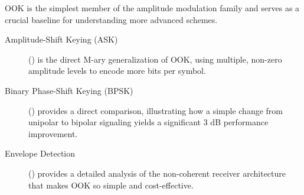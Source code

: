 \begin{importantbox}[title={Further Reading}]
    OOK is the simplest member of the amplitude modulation family and serves as a crucial baseline for understanding more advanced schemes.
    \begin{description}
        \item[Amplitude-Shift Keying (ASK)] () is the direct M-ary generalization of OOK, using multiple, non-zero amplitude levels to encode more bits per symbol.
        \item[Binary Phase-Shift Keying (BPSK)] () provides a direct comparison, illustrating how a simple change from unipolar to bipolar signaling yields a significant 3 dB performance improvement.
        \item[Envelope Detection] () provides a detailed analysis of the non-coherent receiver architecture that makes OOK so simple and cost-effective.
    \end{description}
\end{importantbox}
